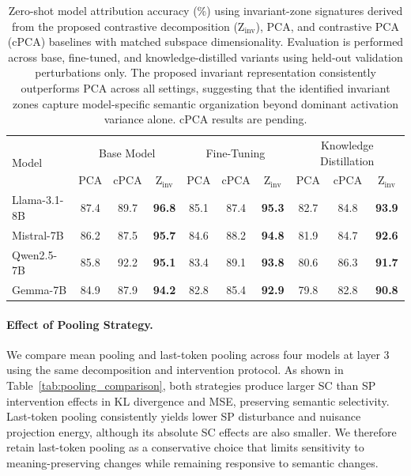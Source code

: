 \begin{table}[!ht]
\centering
\small
\vspace{-1.0em}
\setlength{\tabcolsep}{5pt}
\renewcommand{\arraystretch}{1.2}
\begin{tabular}{l|ccc|ccc|ccc}
\hline
\multirow{2}{*}{Model}
& \multicolumn{3}{c|}{Base Model}
& \multicolumn{3}{c|}{Fine-Tuning}
& \multicolumn{3}{c}{Knowledge Distillation} \\

& PCA & cPCA & Z$_{\text{inv}}$
& PCA & cPCA & Z$_{\text{inv}}$
& PCA & cPCA & Z$_{\text{inv}}$ \\

\hline

Llama-3.1-8B
& 87.4 & 89.7 & \textbf{96.8}
& 85.1 & 87.4 & \textbf{95.3}
& 82.7 & 84.8 & \textbf{93.9} \\

Mistral-7B
& 86.2 & 87.5 & \textbf{95.7}
& 84.6 & 88.2 & \textbf{94.8}
& 81.9 & 84.7 & \textbf{92.6} \\

Qwen2.5-7B
& 85.8 & 92.2 & \textbf{95.1}
& 83.4 & 89.1 & \textbf{93.8}
& 80.6 & 86.3 & \textbf{91.7} \\

Gemma-7B
& 84.9 & 87.9 & \textbf{94.2}
& 82.8 & 85.4 & \textbf{92.9}
& 79.8 & 82.8 & \textbf{90.8} \\

\hline
\end{tabular}
\vspace{0.4em}
\caption{Zero-shot model attribution accuracy (\%) using
invariant-zone signatures derived from the proposed contrastive
decomposition (Z$_{\mathrm{inv}}$), PCA, and contrastive PCA
(cPCA) baselines with matched subspace dimensionality.
Evaluation is performed across base, fine-tuned, and
knowledge-distilled variants using held-out validation
perturbations only. The proposed invariant representation
consistently outperforms PCA across all settings, suggesting
that the identified invariant zones capture model-specific
semantic organization beyond dominant activation variance alone.
cPCA results are pending.}
\label{tab:model_attribution_comparison_cPCA}
\end{table}

\paragraph{Effect of Pooling Strategy.}
We compare mean pooling and last-token pooling across four models
at layer 3 using the same decomposition and intervention protocol.
As shown in Table~\ref{tab:pooling_comparison}, both strategies
produce larger SC than SP intervention effects in KL divergence
and MSE, preserving semantic selectivity. Last-token pooling
consistently yields lower SP disturbance and nuisance projection
energy, although its absolute SC effects are also smaller.
We therefore retain last-token pooling as a conservative choice
that limits sensitivity to meaning-preserving changes while
remaining responsive to semantic changes.

